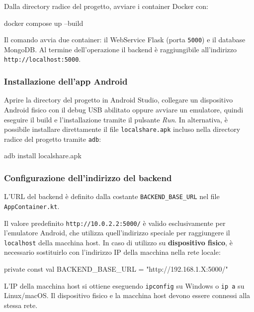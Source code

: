 Dalla directory radice del progetto, avviare i container Docker con:

\begin{codeblock}[language=bash]
docker compose up --build
\end{codeblock}

Il comando avvia due container: il WebService Flask (porta \texttt{5000}) e il database MongoDB. Al termine dell'operazione il backend è raggiungibile all'indirizzo \texttt{http://localhost:5000}.

\subsubsection*{Installazione dell'app Android}

Aprire la directory del progetto in Android Studio, collegare un dispositivo Android fisico con il debug USB abilitato oppure avviare un emulatore, quindi eseguire il build e l'installazione tramite il pulsante \emph{Run}. In alternativa, è possibile installare direttamente il file \texttt{localshare.apk} incluso nella directory radice del progetto tramite \texttt{adb}:

\begin{codeblock}[language=bash]
adb install localshare.apk
\end{codeblock}

\subsubsection*{Configurazione dell'indirizzo del backend}

L'URL del backend è definito dalla costante \texttt{BACKEND\_BASE\_URL} nel file \texttt{AppContainer.kt}.

Il valore predefinito \texttt{http://10.0.2.2:5000/} è valido esclusivamente per l'emulatore Android, che utilizza quell'indirizzo speciale per raggiungere il \texttt{localhost} della macchina host. In caso di utilizzo su \textbf{dispositivo fisico}, è necessario sostituirlo con l'indirizzo IP della macchina nella rete locale:

\begin{codeblock}[language=Kotlin]
private const val BACKEND_BASE_URL = "http://192.168.1.X:5000/"
\end{codeblock}

L'IP della macchina host si ottiene eseguendo \texttt{ipconfig} su Windows o \texttt{ip a} su Linux/macOS. Il dispositivo fisico e la macchina host devono essere connessi alla stessa rete.

